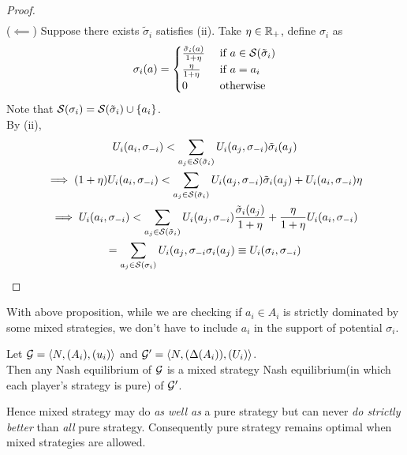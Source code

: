 \documentclass[11pt]{article}
\begin{document}
\begin{proposition}
\begin{proof}
\begin{gather}
				\end{gather}
				($\impliedby$) Suppose there exists $\tilde{\sigma}_i$ satisfies (ii).
				Take $\eta \in \mathbb{R}_+$, define $\sigma_i$ as
				\begin{equation}
					\sigma_i(a) = \begin{cases}
						\frac{\tilde{\sigma}_i(a)}{1+\eta} &\text{{ if }} a \in \mathcal{{S}}(\tilde{\sigma}_i) \\
						\frac{\eta}{1+\eta} &\text{{ if }} a = a_i \\
						0 &\text{{ otherwise}}
					\end{cases}
				\end{equation}
				Note that $\mathcal{{S}}(\sigma_i) = \mathcal{{S}}(\tilde{\sigma}_i) \cup \{a_i\}$.\\
				By (ii), 
				\begin{gather}
					U_i(a_i, \sigma_{-i}) < \sum_{a_j \in \mathcal{{S}}(\tilde{\sigma}_i)} U_i(a_j, \sigma_{-i}) \tilde{\sigma}_i(a_j) \\
					\implies (1+\eta) U_i(a_i, \sigma_{-i}) < \sum_{a_j \in \mathcal{{S}}(\tilde{\sigma}_i)} U_i(a_j, \sigma_{-i}) \tilde{\sigma}_i(a_j) + U_i(a_i, \sigma_{-i}) \eta \\
					\implies U_i(a_i, \sigma_{-i}) < \sum_{a_j \in \mathcal{{S}}(\tilde{\sigma}_i)} U_i(a_j, \sigma_{-i}) \frac{\tilde{\sigma}_i(a_j)}{1+\eta} + \frac{\eta}{1+\eta} U_i(a_i, \sigma_{-i}) \\
					= \sum_{a_j \in \mathcal{{S}}(\sigma_i)} U_i(a_j, \sigma_{-i} \sigma_i(a_j) \equiv U_i(\sigma_i, \sigma_{-i})
				\end{gather}
			\end{proof}
		\end{proposition}
		\begin{remark}
			With above proposition, while we are checking if $a_i \in A_i$ is strictly dominated by some mixed strategies, we don't have to include $a_i$ in the support of potential $\sigma_i$.
		\end{remark}
		
		\begin{proposition}
			Let $\mathcal{{G}} = \langle N, (A_i), (u_i) \rangle$ and $\mathcal{{G}}' = \langle N, (\Delta(A_i)), (U_i) \rangle$. \\
			Then any Nash equilibrium of $\mathcal{{G}}$ is a mixed strategy Nash equilibrium(in which each player's strategy is pure) of $\mathcal{{G}}'$.
		\end{proposition}
		
		\begin{remark}
			Hence mixed strategy may do \emph{as well as} a pure strategy but can never \emph{do strictly better} than \emph{all} pure strategy. Consequently pure strategy remains optimal when mixed strategies are allowed.
		\end{remark}
		
\end{document}
